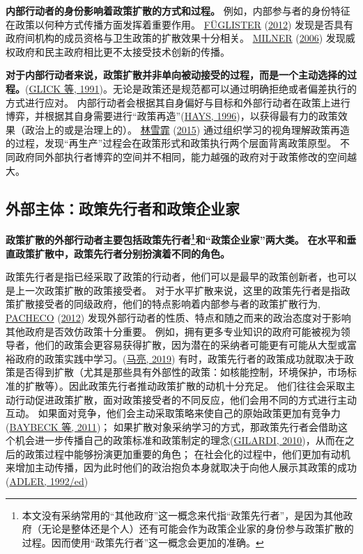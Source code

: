 \documentclass[
  12pt,
]{ctexart}
\begin{document}
\textbf{内部行动者的身份影响着政策扩散的方式和过程。}
例如，内部参与者的身份特征在政策以何种方式传播方面发挥着重要作用。
\protect\hyperlink{ref-Fuglister2012}{FÜGLISTER} (\protect\hyperlink{ref-Fuglister2012}{2012}) 发现是否具有政府间机构的成员资格与卫生政策的扩散效果十分相关。
\protect\hyperlink{ref-Milner2006}{MILNER} (\protect\hyperlink{ref-Milner2006}{2006}) 发现威权政府和民主政府相比更不太接受技术创新的传播。

\textbf{对于内部行动者来说，政策扩散并非单向被动接受的过程，而是一个主动选择的过程。}(\protect\hyperlink{ref-GlickHays1991}{GLICK 等, 1991})。无论是政策还是规范都可以通过明确拒绝或者偏差执行的方式进行应对。
内部行动者会根据其自身偏好与目标和外部行动者在政策上进行博弈，并根据其自身需要进行``政策再造''(\protect\hyperlink{ref-Hays1996}{HAYS, 1996})，以获得最有力的政策效果（政治上的或是治理上的）。
\protect\hyperlink{ref-LinXueFei2015}{林雪霏} (\protect\hyperlink{ref-LinXueFei2015}{2015}) 通过组织学习的视角理解政策再造的过程，发现``再生产''过程会在政策形式和政策执行两个层面背离政策原型。
不同政府同外部执行者博弈的空间并不相同，能力越强的政府对于政策修改的空间越大。

\hypertarget{ux5916ux90e8ux4e3bux4f53ux653fux7b56ux5148ux884cux8005ux548cux653fux7b56ux4f01ux4e1aux5bb6}{%
\subsection{外部主体：政策先行者和政策企业家}\label{ux5916ux90e8ux4e3bux4f53ux653fux7b56ux5148ux884cux8005ux548cux653fux7b56ux4f01ux4e1aux5bb6}}

\textbf{政策扩散的外部行动者主要包括政策先行者\footnote{本文没有采纳常用的``其他政府''这一概念来代指``政策先行者''，是因为其他政府（无论是整体还是个人）还有可能会作为政策企业家的身份参与政策扩散的过程。因而使用``政策先行者''这一概念会更加的准确。}和``政策企业家''两大类。}
\textbf{在水平和垂直政策扩散中，政策先行者分别扮演着不同的角色。}

政策先行者是指已经采取了政策的行动者，他们可以是最早的政策创新者，也可以是上一次政策扩散的政策接受者。
对于水平扩散来说，这里的政策先行者是指政策扩散接受者的同级政府，他们的特点影响着内部参与者的政策扩散行为,
\protect\hyperlink{ref-Pacheco2012a}{PACHECO} (\protect\hyperlink{ref-Pacheco2012a}{2012}) 发现外部行动者的性质、特点和随之而来的政治态度对于影响其他政府是否效仿政策十分重要。
例如，拥有更多专业知识的政府可能被视为领导者，他们的政策会更容易获得扩散，因为潜在的采纳者可能更有可能从大型或富裕政府的政策实践中学习。(\protect\hyperlink{ref-MaLiang2019}{马亮, 2019})
有时，政策先行者的政策成功就取决于政策是否得到扩散（尤其是那些具有外部性的政策：如核能控制，环境保护，市场标准的扩散等）。因此政策先行者推动政策扩散的动机十分充足。
他们往往会采取主动行动促进政策扩散，面对政策接受者的不同反应，他们会用不同的方式进行主动互动。
如果面对竞争，他们会主动采取策略来使自己的原始政策更加有竞争力(\protect\hyperlink{ref-BaybeckEtAl2011}{BAYBECK 等, 2011})；
如果扩散对象采纳学习的方式，那政策先行者会借助这个机会进一步传播自己的政策标准和政策制定的理念(\protect\hyperlink{ref-Gilardi2010b}{GILARDI, 2010})，从而在之后的政策过程中能够扮演更加重要的角色；
在社会化的过程中，他们更加有动机来增加主动传播，因为此时他们的政治抱负本身就取决于向他人展示其政策的成功(\protect\hyperlink{ref-Adler1992}{ADLER, 1992/ed})
\end{document}

